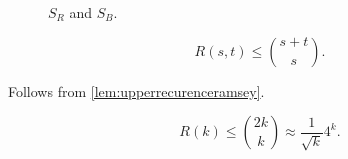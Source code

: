 \begin{figure}[ht]
    \centering
    \caption{$S_R$ and $S_B$.}
    \label{fig:red-and-blue-neighbors}
\end{figure}

\begin{thm}
	\[
		R(s, t) \le \binom{s + t}{s}.
	\]	
\end{thm}

\begin{dem}
	Follows from \cref{lem:upperrecurenceramsey}.
\end{dem}

\begin{thm}
	\[
		R(k) \le \binom{2k}{k} \approx \frac{1}{\sqrt{k}}4^k.
	\]
\end{thm}
